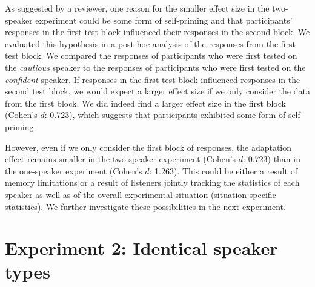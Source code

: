 \documentclass[10pt,letterpaper]{article}
\begin{document}
As suggested by a reviewer, one reason for the smaller effect size in the two-speaker
experiment could be some form of self-priming and that participants' responses in the first 
test block influenced their responses in the second block. We evaluated this hypothesis
in a post-hoc analysis of the responses from the first test block. We 
compared the responses of participants who were first
tested on the \textit{cautious} speaker to the responses of participants who were first tested 
on the \textit{confident} speaker. If responses in the first test block influenced responses in 
the second test block, we would expect a larger effect size if we only consider the data
from the first block. We did indeed find a larger effect size in the first block (Cohen's $d$: 0.723), which
suggests that participants exhibited some form of self-priming.


However, even if we only consider the first block of responses, the adaptation effect 
remains smaller in the two-speaker experiment (Cohen's $d$: 0.723) than in the
one-speaker experiment (Cohen's $d$: 1.263). This could be either a result of memory limitations 
or a result of listeners jointly tracking the statistics of each speaker
as well as of the overall experimental situation (situation-specific statistics).
We further investigate these possibilities in the next experiment.


\section{Experiment 2: Identical speaker types}
\end{document}
